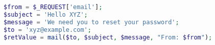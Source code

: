 \begin{lstlisting}[language=PHP,caption={PHP program with e-mail
      header injection vulnerability.},label={code:phpemi}, float]
$from = $_REQUEST['email'];
$subject = 'Hello XYZ';
$message = 'We need you to reset your password';
$to = 'xyz@example.com';
$retValue = mail($to, $subject, $message, "From: $from");
\end{lstlisting}
